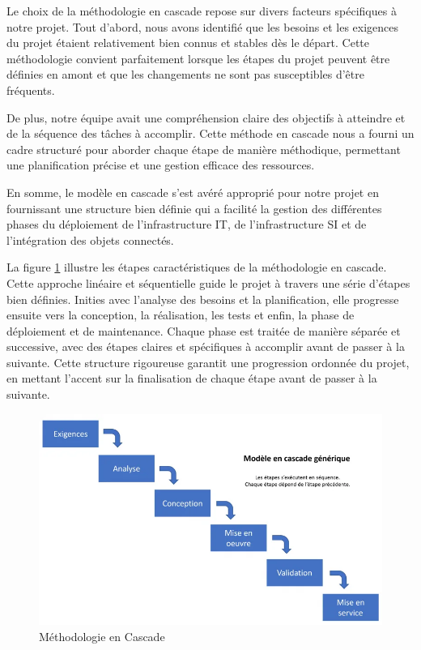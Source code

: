 Le choix de la méthodologie en cascade repose sur divers facteurs spécifiques à notre projet. Tout d'abord, nous avons identifié que les besoins et les exigences du projet étaient relativement bien connus et stables dès le départ. Cette méthodologie convient parfaitement lorsque les étapes du projet peuvent être définies en amont et que les changements ne sont pas susceptibles d'être fréquents.

De plus, notre équipe avait une compréhension claire des objectifs à atteindre et de la séquence des tâches à accomplir. Cette méthode en cascade nous a fourni un cadre structuré pour aborder chaque étape de manière méthodique, permettant une planification précise et une gestion efficace des ressources. 

En somme, le modèle en cascade s'est avéré approprié pour notre projet en fournissant une structure bien définie qui a facilité la gestion des différentes phases du déploiement de l'infrastructure IT, de l'infrastructure SI et de l'intégration des objets connectés.


La figure \ref{Chap1.4} illustre les étapes caractéristiques de la méthodologie en cascade. Cette approche linéaire \cite{blogcascade} et séquentielle guide le projet à travers une série d'étapes bien définies. Inities avec l'analyse des besoins et la planification, elle progresse ensuite vers la conception, la réalisation, les tests et enfin, la phase de déploiement et de maintenance. Chaque phase est traitée de manière séparée et successive, avec des étapes claires et spécifiques à accomplir avant de passer à la suivante. Cette structure rigoureuse garantit une progression ordonnée du projet, en mettant l'accent sur la finalisation de chaque étape avant de passer à la suivante.


\begin{figure}[H]
 \centering
    \includegraphics[width=15cm]{Images/cascade1.png}
    \caption{Méthodologie en Cascade}
    \label{Chap1.4}
\end{figure}

